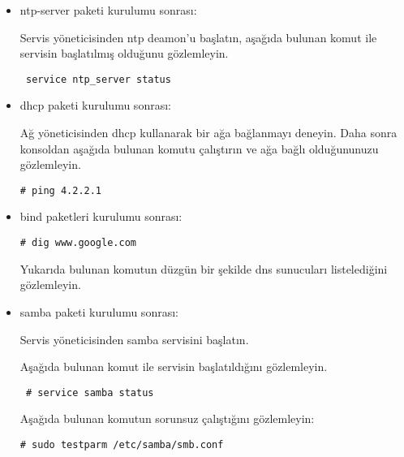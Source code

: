 \documentclass[a4paper,10pt]{article}
\begin{document}
\begin{itemize}


\item ntp-server paketi kurulumu sonrası:

Servis yöneticisinden ntp deamon'u başlatın, aşağıda bulunan komut ile servisin başlatılmış olduğunu gözlemleyin.
\begin{verbatim}
 service ntp_server status
\end{verbatim}


 \item dhcp paketi kurulumu sonrası:

Ağ yöneticisinden dhcp kullanarak bir ağa bağlanmayı deneyin. Daha sonra konsoldan aşağıda bulunan komutu çalıştırın ve ağa bağlı olduğununuzu gözlemleyin.
\begin{verbatim}
# ping 4.2.2.1
\end{verbatim}

\item bind paketleri kurulumu sonrası:
\begin{verbatim}
# dig www.google.com
\end{verbatim}
Yukarıda bulunan komutun düzgün bir şekilde dns sunucuları listelediğini gözlemleyin.

\item samba paketi kurulumu sonrası:

Servis yöneticisinden samba servisini başlatın.

Aşağıda bulunan komut ile servisin başlatıldığını gözlemleyin.
\begin{verbatim}
 # service samba status 
\end{verbatim}

 Aşağıda bulunan komutun sorunsuz çalıştığını gözlemleyin:
\begin{verbatim}
# sudo testparm /etc/samba/smb.conf
\end{verbatim}

\end{itemize}
\end{document}
